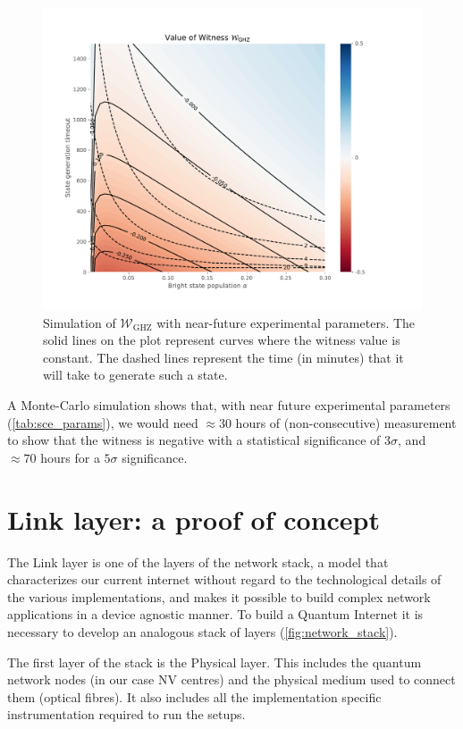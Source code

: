 \documentclass[a4paper, twoside]{article}
\begin{document}
\begin{figure}
	\includegraphics[width=\textwidth, trim=1cm 1cm 3cm 1cm 0cm]{../images/witness.pdf}
	\caption{Simulation of $\mathcal W_\text{GHZ}$ with near-future experimental parameters. The solid lines on the plot represent curves where the witness value is constant. The dashed lines represent the time (in minutes) that it will take to generate such a state.}
	\label{fig:witness}
\end{figure}

A Monte-Carlo simulation shows that, with near future experimental parameters (\autoref{tab:sce_params}), we would need $\approx 30$ hours of (non-consecutive) measurement to show that the witness is negative with a statistical significance of $3\sigma$, and $\approx 70$ hours for a $5\sigma$ significance.

\section{Link layer: a proof of concept}
\label{sec:link}

The Link layer is one of the layers of the network stack, a model that characterizes our current internet without regard to the technological details of the various implementations, and makes it possible to build complex network applications in a device agnostic manner. To build a Quantum Internet it is necessary to develop an analogous stack of layers (\autoref{fig:network_stack}). 

The first layer of the stack is the Physical layer. This includes the quantum network nodes (in our case NV centres) and the physical medium used to connect them (optical fibres). It also includes all the implementation specific instrumentation required to run the setups.
\end{document}
